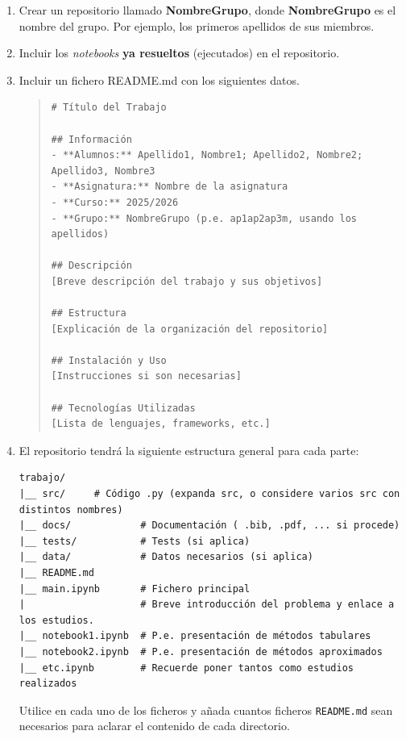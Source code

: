 \documentclass[a4paper, 11pt]{article}
\begin{document}
\begin{enumerate}
\item Crear un repositorio llamado \textbf{NombreGrupo}, donde \textbf{NombreGrupo} es el nombre del grupo. Por ejemplo, los primeros apellidos de sus miembros.

\item Incluir los \textit{notebooks} \textbf{ya resueltos} (ejecutados) en el repositorio.

\item Incluir  un fichero README.md con los siguientes datos.


\begin{quote}\footnotesize
\begin{verbatim}
# Título del Trabajo

## Información
- **Alumnos:** Apellido1, Nombre1; Apellido2, Nombre2; Apellido3, Nombre3
- **Asignatura:** Nombre de la asignatura
- **Curso:** 2025/2026
- **Grupo:** NombreGrupo (p.e. ap1ap2ap3m, usando los apellidos)

## Descripción
[Breve descripción del trabajo y sus objetivos]

## Estructura
[Explicación de la organización del repositorio]

## Instalación y Uso
[Instrucciones si son necesarias]

## Tecnologías Utilizadas
[Lista de lenguajes, frameworks, etc.]
\end{verbatim}
\end{quote}


\item El repositorio tendrá la siguiente estructura general para cada parte:


\begin{verbatim}
trabajo/
|__ src/     # Código .py (expanda src, o considere varios src con distintos nombres)
|__ docs/            # Documentación ( .bib, .pdf, ... si procede)
|__ tests/           # Tests (si aplica)
|__ data/            # Datos necesarios (si aplica)
|__ README.md 
|__ main.ipynb       # Fichero principal
|                    # Breve introducción del problema y enlace a los estudios.
|__ notebook1.ipynb  # P.e. presentación de métodos tabulares
|__ notebook2.ipynb  # P.e. presentación de métodos aproximados
|__ etc.ipynb        # Recuerde poner tantos como estudios realizados
\end{verbatim}

Utilice  en cada uno de los ficheros y añada cuantos ficheros \texttt{README.md} sean necesarios para aclarar el contenido de cada directorio.


\end{enumerate}
\end{document}
